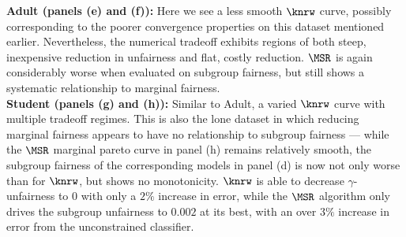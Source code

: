 \noindent
{\bf Adult (panels (e) and (f)):}
Here we see a less smooth $\knrw$ curve, possibly corresponding to the poorer convergence properties on this dataset mentioned earlier. Nevertheless,
	the numerical tradeoff exhibits regions of both steep, inexpensive reduction in unfairness and flat, costly reduction.
	$\MSR$ is again considerably worse when evaluated on subgroup fairness, but still shows a systematic relationship to marginal fairness.\\

\noindent
{\bf Student (panels (g) and (h)):}
Similar to Adult, a varied $\knrw$ curve with multiple tradeoff regimes. This is also the lone dataset in which reducing marginal
	fairness appears to have no relationship to subgroup fairness --- while the $\MSR$ marginal pareto curve in panel (h) remains
	relatively smooth, the subgroup fairness of the corresponding models in panel (d) is now not only worse than for $\knrw$,
	but shows no monotonicity.
	$\knrw$ is able to decrease $\gamma$-unfairness to $0$ with only a $2\%$ increase in error,
	while the $\MSR$ algorithm only drives the subgroup unfairness to $0.002$ at its best,
	with an over $3\%$ increase in error from the unconstrained classifier.\\

